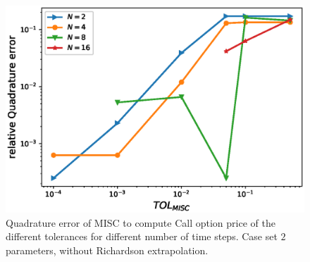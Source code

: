 \documentclass[11pt]{article}
\begin{document}
\begin{figure}[h!]
	\centering
	\includegraphics[width=0.7\linewidth]{./figures/rBergomi_MISC_quadratre_error/vs_TOL/set2/relative_quad_error_wrt_MISC_TOL_set2_non_rich}
	
	
	\caption{Quadrature error of MISC to compute Call option price of the different tolerances for different number of time steps. Case  set $2$ parameters, without Richardson extrapolation.}
	\label{fig:Quadrature_error_set2}
\end{figure}
\end{document}
